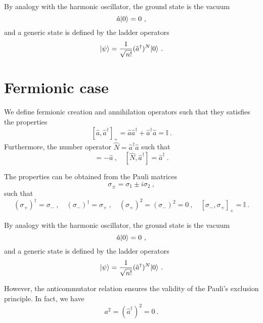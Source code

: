     By analogy with the harmonic oscillator, the ground state is the vacuum 
    \begin{equation*}
        \hat a \vert0\rangle = 0 ~,
    \end{equation*}
    and a generic state is defined by the ladder operators
    \begin{equation*}
        \vert\psi\rangle = \frac{1}{\sqrt{n!}} (\hat a^\dagger)^N \vert0\rangle ~.
    \end{equation*}

\section{Fermionic case}

    We define fermionic creation and annihilation operators such that they satisfies the properties 
    \begin{equation}\label{ferm}
        [\hat a, \hat a^\dagger]_+ = \hat a \hat a^\dagger + \hat a^\dagger \hat a = \mathbb I ~.
    \end{equation}
    Furthermore, the number operator $\hat N = \hat a^\dagger \hat a$ such that 
    \begin{equation*}
        [\hat N, \hat a] = - \hat a~, \quad [\hat N, \hat a^\dagger] = \hat a^\dagger ~.
    \end{equation*} 

    The properties can be obtained from the Pauli matrices 
    \begin{equation*}
        \sigma_\pm = \sigma_1 \pm i \sigma_2 ~,
    \end{equation*}
    such that 
    \begin{equation*}
        (\sigma_+)^\dagger = \sigma_- ~, \quad (\sigma_-)^\dagger = \sigma_+ ~, \quad (\sigma_+)^2 = (\sigma_-)^2 = 0 ~, \quad [\sigma_-, \sigma_+]_+ = \mathbb I ~.
    \end{equation*}

    By analogy with the harmonic oscillator, the ground state is the vacuum 
    \begin{equation*}
        \hat a \vert0\rangle = 0 ~,
    \end{equation*}
    and a generic state is defined by the ladder operators
    \begin{equation*}
        \vert\psi\rangle = \frac{1}{\sqrt{n!}} (\hat a^\dagger)^N \vert0\rangle ~.
    \end{equation*}

    However, the anticommutator relation ensures the validity of the Pauli's exclusion principle. In fact, we have 
    \begin{equation*}
        a^2 = (\hat a^\dagger)^2 = 0 ~.
    \end{equation*}


